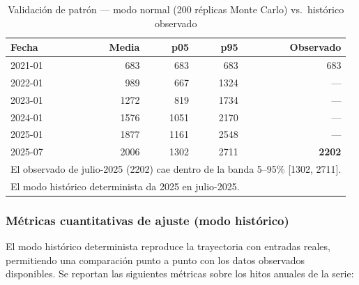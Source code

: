 \documentclass[12pt,a4paper]{article}
\begin{document}
\begin{table}[H]
  \centering
  \caption{Validación de patrón — modo normal (200 réplicas Monte Carlo)
    vs.\ histórico observado}
  \label{tab:validacion}
  \begin{tabular}{@{}lrrrr@{}}
    \toprule
    \rowcolor{azulDS!15}
    \textbf{Fecha} & \textbf{Media} & \textbf{p05} & \textbf{p95} & \textbf{Observado}                               \\
    \midrule
    2021-01        & 683            & 683          & 683          & 683                                              \\
    2022-01        & 989            & 667          & 1324         & ---                                              \\
    2023-01        & 1272           & 819          & 1734         & ---                                              \\
    2024-01        & 1576           & 1051         & 2170         & ---                                              \\
    2025-01        & 1877           & 1161         & 2548         & ---                                              \\
    2025-07        & 2006           & 1302         & 2711         & \textbf{2202}                                    \\
    \bottomrule
    \multicolumn{5}{l}{\footnotesize El observado de julio-2025 (2202) cae dentro de la banda 5--95\% [1302, 2711].} \\
    \multicolumn{5}{l}{\footnotesize El modo histórico determinista da 2025 en julio-2025.}
  \end{tabular}
\end{table}

\subsubsection*{Métricas cuantitativas de ajuste (modo histórico)}

El modo histórico determinista reproduce la trayectoria con entradas reales, permitiendo una comparación punto a punto con los datos observados disponibles. Se reportan las siguientes métricas sobre los hitos anuales de la serie:
\end{document}
